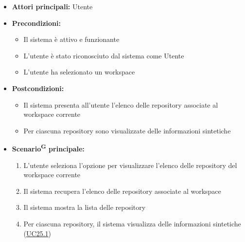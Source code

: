 \documentclass[a4paper, 11pt]{article}
\begin{document}
\begin{itemize}
	\item \textbf{Attori principali:} Utente
	\item \textbf{Precondizioni:}
	\begin{itemize}
		\item Il sistema è attivo e funzionante
		\item L'utente è stato riconosciuto dal sistema come Utente
		\item L'utente ha selezionato un workspace
	\end{itemize}
	\item \textbf{Postcondizioni:}
	\begin{itemize}
		\item Il sistema presenta all'utente l'elenco delle repository associate al workspace corrente
		\item Per ciascuna repository sono visualizzate delle informazioni sintetiche
	\end{itemize}
	\item \textbf{Scenario\textsuperscript{G} principale:}
	\begin{enumerate}
		\item L'utente seleziona l'opzione per visualizzare l'elenco delle repository del workspace corrente
		\item Il sistema recupera l'elenco delle repository associate al workspace
		\item Il sistema mostra la lista delle repository
		\item Per ciascuna repository, il sistema visualizza delle informazioni sintetiche (\hyperref[UC25.1]{UC25.1})
	\end{enumerate}


\end{itemize}
\end{document}
